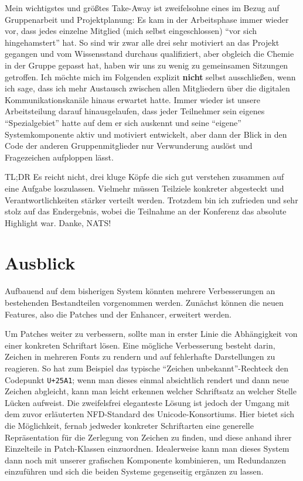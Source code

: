 \documentclass[11pt,a4paper]{article}
\begin{document}
Mein wichtigstes und größtes Take-Away ist zweifelsohne eines im Bezug auf Gruppenarbeit und Projektplanung: Es kam in der Arbeitsphase immer wieder vor, dass jedes einzelne Mitglied (mich selbst eingeschlossen) \enquote{vor sich hingehamstert} hat. So sind wir zwar alle drei sehr motiviert an das Projekt gegangen und vom Wissensstand durchaus qualifiziert, aber obgleich die Chemie in der Gruppe gepasst hat, haben wir uns zu wenig zu gemeinsamen Sitzungen getroffen. Ich möchte mich im Folgenden explizit \textbf{nicht} selbst ausschließen, wenn ich sage, dass ich mehr Austausch zwischen allen Mitgliedern über die digitalen Kommunikationskanäle hinaus erwartet hatte. Immer wieder ist unsere Arbeitsteilung darauf hinausgelaufen, dass jeder Teilnehmer sein eigenes \enquote{Spezialgebiet} hatte auf dem er sich auskennt und seine \enquote{eigene} Systemkomponente aktiv und motiviert entwickelt, aber dann der Blick in den Code der anderen Gruppenmitglieder nur Verwunderung auslöst und Fragezeichen aufploppen lässt.

TL;DR Es reicht nicht, drei kluge Köpfe die sich gut verstehen zusammen auf eine Aufgabe loszulassen. Vielmehr müssen Teilziele konkreter abgesteckt und Verantwortlichkeiten stärker verteilt werden. Trotzdem bin ich zufrieden und sehr stolz auf das Endergebnis, wobei die Teilnahme an der Konferenz das absolute Highlight war. Danke, NATS!

\section{Ausblick}
\label{sec:future_work}

Aufbauend auf dem bisherigen System könnten mehrere Verbesserungen an bestehenden Bestandteilen vorgenommen werden.
Zunächst können die neuen Features, also die Patches und der Enhancer, erweitert werden.

Um Patches weiter zu verbessern, sollte man in erster Linie die Abhängigkeit von einer konkreten Schriftart lösen. Eine mögliche Verbesserung besteht darin, Zeichen in mehreren Fonts zu rendern und auf fehlerhafte Darstellungen zu reagieren. So hat zum Beispiel das typische \enquote{Zeichen unbekannt}-Rechteck den Codepunkt \texttt{U+25A1}; wenn man dieses einmal absichtlich rendert und dann neue Zeichen abgleicht, kann man leicht erkennen welcher Schriftsatz an welcher Stelle Lücken aufweist.
Die zweifelsfrei eleganteste Lösung ist jedoch der Umgang mit dem zuvor erläuterten NFD-Standard des Unicode-Konsortiums. Hier bietet sich die Möglichkeit, fernab jedweder konkreter Schriftarten eine generelle Repräsentation für die Zerlegung von Zeichen zu finden, und diese anhand ihrer Einzelteile in Patch-Klassen einzuordnen. Idealerweise kann man dieses System dann noch mit unserer grafischen Komponente kombinieren, um Redundanzen einzuführen und sich die beiden Systeme gegenseitig ergänzen zu lassen.
\end{document}
